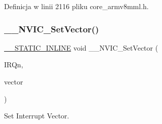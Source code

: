 Definicja w linii 2116 pliku core\+\_\+armv8mml.\+h.

\mbox{\label{group___c_m_s_i_s___core___n_v_i_c_functions_ga0df355460bc1783d58f9d72ee4884208}} 
\subsubsection{\texorpdfstring{\+\_\+\+\_\+\+N\+V\+I\+C\+\_\+\+Set\+Vector()}{\_\_NVIC\_SetVector()}}
{\footnotesize\ttfamily \hyperlink{cmsis__iccarm_8h_aba87361bfad2ae52cfe2f40c1a1dbf9c}{\+\_\+\+\_\+\+S\+T\+A\+T\+I\+C\+\_\+\+I\+N\+L\+I\+NE} void \+\_\+\+\_\+\+N\+V\+I\+C\+\_\+\+Set\+Vector (\begin{DoxyParamCaption}\item[{\hyperlink{group___peripheral__interrupt__number__definition_ga7e1129cd8a196f4284d41db3e82ad5c8}{I\+R\+Qn\+\_\+\+Type}}]{I\+R\+Qn,  }\item[{uint32\+\_\+t}]{vector }\end{DoxyParamCaption})}



Set Interrupt Vector. 

